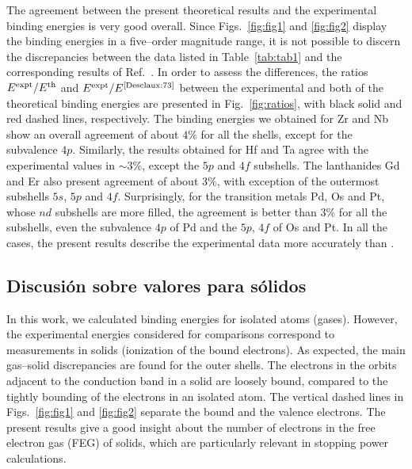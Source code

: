 The agreement between the present theoretical results and the
experimental binding energies is very good overall.
Since Figs.~\ref{fig:fig1} and \ref{fig:fig2} display the binding
energies in a five--order magnitude range, it is not possible to
discern the discrepancies between the data listed in Table~\ref{tab:tab1}
and the corresponding results of Ref.~\cite{Desclaux:73}.
In order to assess the differences, the ratios $E^{\mbox{\scriptsize expt}}/E^{\mbox{\scriptsize th}}$
and $E^{\mbox{\scriptsize expt}}/E^{\mbox{\scriptsize \cite{Desclaux:73}}}$
between the experimental and both of the theoretical binding energies
are presented in Fig.~\ref{fig:ratios}, with black solid and red dashed
lines, respectively.
The binding energies we obtained for Zr and Nb show an
overall agreement of about $4\%$ for all the shells, except for the
subvalence $4p$. Similarly, the results obtained for Hf and Ta agree
with the experimental values in $\sim3\%$, except the $5p$ and $4f$
subshells. The lanthanides Gd and Er also present agreement of about
$3\%$, with exception of the outermost subshells $5s$, $5p$ and $4f$.
Surprisingly, for the transition metals Pd, Os and Pt, whose $nd$
subshells are more filled, the agreement is better than $3\%$ for all
the subshells, even the subvalence $4p$ of Pd and the $5p$, $4f$ of
Os and Pt. In all the cases, the present results describe the experimental data 
more accurately than \cite{Desclaux:73}.

\subsection{Discusión sobre valores para sólidos}

In this work, we calculated binding energies for isolated atoms (gases). 
However, the experimental energies considered for comparisons \cite{expdata}
correspond to measurements in solids (ionization of the bound electrons). 
As expected, the main gas--solid discrepancies are found for the outer 
shells. The electrons in the orbits adjacent to the conduction band
in a solid are loosely bound, compared to the tightly bounding
of the electrons in an isolated atom. The vertical dashed lines in Figs.~\ref{fig:fig1} and 
\ref{fig:fig2} separate the bound and the valence electrons.
The present results give a good insight about the number of electrons 
in the free electron gas (FEG) of solids, which 
are particularly relevant in stopping power calculations. 



